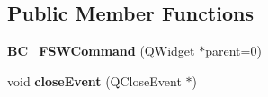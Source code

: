 \subsection*{Public Member Functions}
\begin{DoxyCompactItemize}
\item 
{\bfseries B\+C\+\_\+\+F\+S\+W\+Command} (Q\+Widget $\ast$parent=0)\hypertarget{class_b_c___f_s_w_command_a43ac12045e383c6b5a688bc6de1cfb5d}{}\label{class_b_c___f_s_w_command_a43ac12045e383c6b5a688bc6de1cfb5d}

\item 
void {\bfseries close\+Event} (Q\+Close\+Event $\ast$)\hypertarget{class_b_c___f_s_w_command_a45bf341a14d5bb88f96dcdd8080ceece}{}\label{class_b_c___f_s_w_command_a45bf341a14d5bb88f96dcdd8080ceece}

\end{DoxyCompactItemize}
